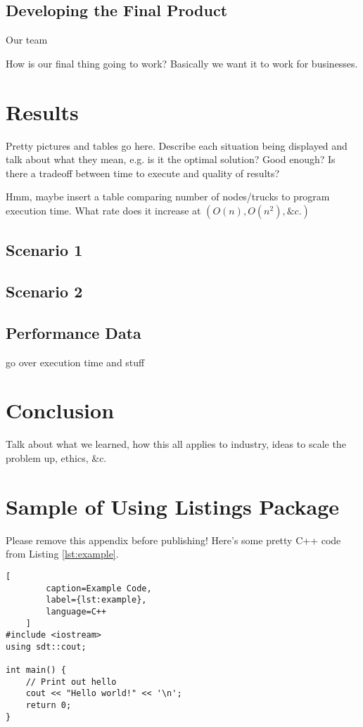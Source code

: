 \documentclass[letterpaper]{article}
\begin{document}

    \subsection{Developing the Final Product}
    \label{subsection:Developing_the_Final_Product}
    Our team 

    How is our final thing going to work? Basically we want it to work for businesses.

    \section{Results}
    \label{section:Results}
    Pretty pictures and tables go here. Describe each situation being displayed and talk about what they mean, e.g. is it the optimal solution? Good enough? Is there a tradeoff between time to execute and quality of results?

    Hmm, maybe insert a table comparing number of nodes/trucks to program execution time. What rate does it increase at $(O(n), O(n^2), \&c.)$

    \subsection{Scenario 1}

    \subsection{Scenario 2}

    \subsection{Performance Data}
    go over execution time and stuff

    \section{Conclusion}
    \label{section:Conclusion}
    Talk about what we learned, how this all applies to industry, ideas to scale the problem up, ethics, \&c.

    \appendix
    \section{Sample of Using Listings Package}
    Please remove this appendix before publishing! Here's some pretty C++ code from Listing \ref{lst:example}.
    \begin{lstlisting}[
        caption=Example Code,
        label={lst:example},
        language=C++
    ]
#include <iostream>
using sdt::cout;

int main() {
    // Print out hello
    cout << "Hello world!" << '\n';
    return 0;
}\end{lstlisting}
\end{document}
